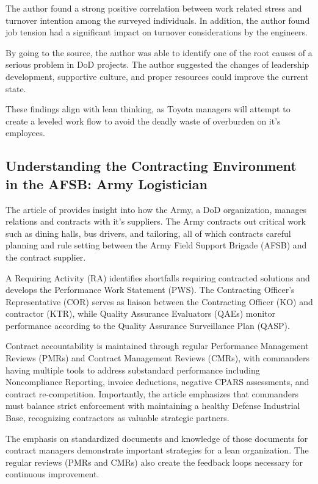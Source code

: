 \documentclass{article}
\begin{document}
		The author found a strong positive correlation between work related stress and turnover intention among the surveyed individuals.
		In addition, the author found job tension had a significant impact on turnover considerations by the engineers.

		By going to the source, the author was able to identify one of the root causes of a serious problem in DoD projects. 
		The author suggested the changes of leadership development, supportive culture, and proper resources could improve the current state. 

		These findings align with lean thinking, as Toyota managers will attempt to create a leveled work flow to avoid the deadly waste of overburden on it's employees. 
	


	\subsection{Understanding the Contracting Environment in the AFSB: Army Logistician \cite{Carlstedt2020}}

		The article of \cite{Carlstedt2020} provides insight into how the Army, a DoD organization, manages relations and contracts with it's suppliers.
		The Army contracts out critical work such as dining halls, bus drivers, and tailoring, all of which contracts careful planning and rule setting between the Army Field Support Brigade (AFSB) and the contract supplier. 

		A Requiring Activity (RA) identifies shortfalls requiring contracted solutions and develops the Performance Work Statement (PWS). 
		The Contracting Officer's Representative (COR) serves as liaison between the Contracting Officer (KO) and contractor (KTR), while Quality Assurance Evaluators (QAEs) monitor performance according to the Quality Assurance Surveillance Plan (QASP). 

		Contract accountability is maintained through regular Performance Management Reviews (PMRs) and Contract Management Reviews (CMRs), with commanders having multiple tools to address substandard performance including Noncompliance Reporting, invoice deductions, negative CPARS assessments, and contract re-competition. 
		Importantly, the article emphasizes that commanders must balance strict enforcement with maintaining a healthy Defense Industrial Base, recognizing contractors as valuable strategic partners.

		The emphasis on standardized documents and knowledge of those documents for contract managers demonstrate important strategies for a lean organization.
		The regular reviews (PMRs and CMRs) also create the feedback loops necessary for continuous improvement.
\end{document}
